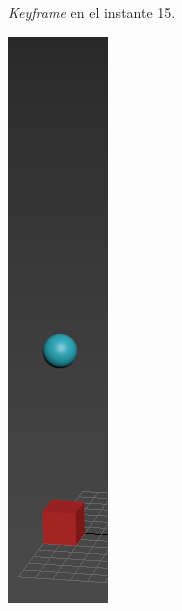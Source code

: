 \documentclass{article}
\begin{document}
\begin{figure}[H]
\begin{subfigure}[H]{0.15\textwidth}
	    \caption{\textit{Keyframe} en el instante 15.}
	\end{subfigure}
    \hfill
	\begin{subfigure}[H]{0.15\textwidth}
	    \centering
	    \includegraphics[width=\textwidth]{imagenes/p1_ins25.png}

\end{subfigure}
\end{figure}
\end{document}
